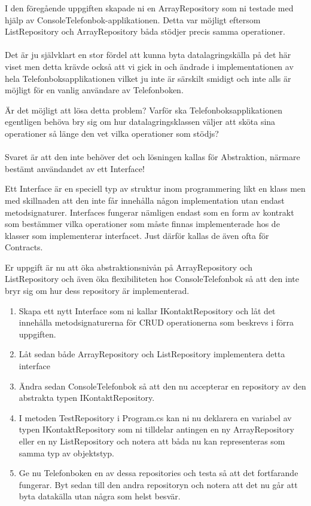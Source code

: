 \documentclass{article}
\begin{document}
I den föregående uppgiften skapade ni en ArrayRepository som ni testade med hjälp av ConsoleTelefonbok-applikationen. Detta var möjligt eftersom ListRepository och ArrayRepository båda stödjer precis samma operationer.\\ \\
Det är ju självklart en stor fördel att kunna byta datalagringskälla på det här viset men detta krävde också att vi gick in och ändrade i implementationen av hela Telefonboksapplikationen vilket ju inte är särskilt smidigt och inte alls är möjligt för en vanlig användare av Telefonboken.

Är det möjligt att lösa detta problem? Varför ska Telefonboksapplikationen egentligen behöva bry sig om hur datalagringsklassen väljer att sköta sina operationer så länge den vet vilka operationer som stödjs? \\ \\Svaret är att den inte behöver det och lösningen kallas för Abstraktion, närmare bestämt användandet av ett Interface!

Ett Interface är en speciell typ av struktur inom programmering likt en klass men med skillnaden att den inte får innehålla någon implementation utan endast metodsignaturer. Interfaces fungerar nämligen endast som en form av kontrakt som bestämmer vilka operationer som måste finnas implementerade hos de klasser som implementerar interfacet. Just därför kallas de även ofta för Contracts. 

Er uppgift är nu att öka abstraktionsnivån på ArrayRepository och ListRepository och även öka flexibiliteten hos ConsoleTelefonbok så att den inte bryr sig om hur dess repository är implementerad.

    \begin{enumerate}
                 \item Skapa ett nytt Interface som ni kallar IKontaktRepository och låt det innehålla metodsignaturerna för CRUD operationerna som beskrevs i förra uppgiften.
                 \item Låt sedan både ArrayRepository och ListRepository implementera detta interface
                 \item Ändra sedan ConsoleTelefonbok så att den nu accepterar en repository av den abstrakta typen IKontaktRepository.
                 \item I metoden TestRepository i Program.cs kan ni nu deklarera en variabel av typen IKontaktRepository som ni tilldelar antingen en ny ArrayRepository eller en ny ListRepository och notera att båda nu kan representeras som samma typ av objektstyp.
                 \item Ge nu Telefonboken en av dessa repositories och testa så att det fortfarande fungerar. Byt sedan till den andra repositoryn och notera att det nu går att byta datakälla utan några som helst besvär.
    	              
     \end{enumerate}
     
\end{document}
